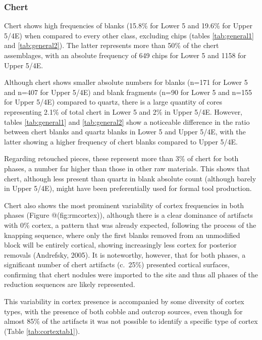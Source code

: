\documentclass[12pt,twoside]{reedthesis}
\begin{document}
\hypertarget{chert}{%
\subsubsection{Chert}\label{chert}}

Chert shows high frequencies of blanks (15.8\% for Lower 5 and 19.6\% for Upper 5/4E) when compared to every other class, excluding chips (tables \ref{tab:general1} and \ref{tab:general2}). The latter represents more than 50\% of the chert assemblages, with an absolute frequency of 649 chips for Lower 5 and 1158 for Upper 5/4E.

Although chert shows smaller absolute numbers for blanks (n=171 for Lower 5 and n=407 for Upper 5/4E) and blank fragments (n=90 for Lower 5 and n=155 for Upper 5/4E) compared to quartz, there is a large quantity of cores representing 2.1\% of total chert in Lower 5 and 2\% in Upper 5/4E. However, tables \ref{tab:general1} and \ref{tab:general2} show a noticeable difference in the ratio between chert blanks and quartz blanks in Lower 5 and Upper 5/4E, with the latter showing a higher frequency of chert blanks compared to Upper 5/4E.

Regarding retouched pieces, these represent more than 3\% of chert for both phases, a number far higher than those in other raw materials. This shows that chert, although less present than quartz in blank absolute count (although barely in Upper 5/4E), might have been preferentially used for formal tool production.

Chert also shows the most prominent variability of cortex frequencies in both phases (Figure @(fig:rmcortex)), although there is a clear dominance of artifacts with 0\% cortex, a pattern that was already expected, following the process of the knapping sequence, where only the first blanks removed from an unmodified block will be entirely cortical, showing increasingly less cortex for posterior removals (Andrefsky, 2005). It is noteworthy, however, that for both phases, a significant number of chert artifacts (c.~25\%) presented cortical surfaces, confirming that chert nodules were imported to the site and thus all phases of the reduction sequences are likely represented.

This variability in cortex presence is accompanied by some diversity of cortex types, with the presence of both cobble and outcrop sources, even though for almost 85\% of the artifacts it was not possible to identify a specific type of cortex (Table \ref{tab:cortextab1}).
\end{document}
